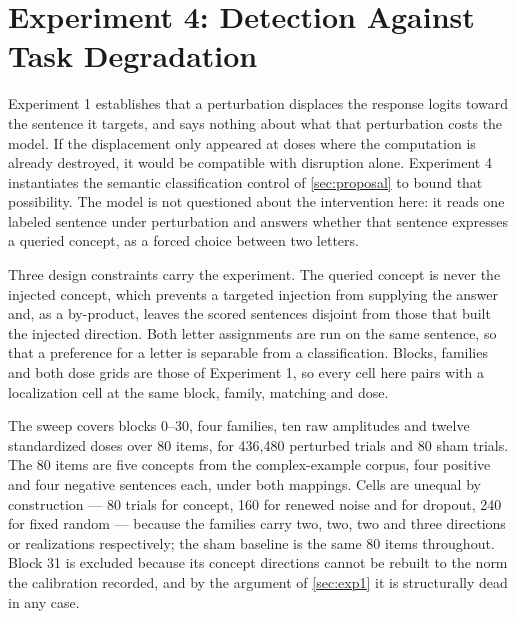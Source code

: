 
\section{Experiment 4: Detection Against Task Degradation}
\label{sec:exp4}

Experiment 1 establishes that a perturbation displaces the response logits toward the sentence it targets, and says nothing about what that perturbation costs the model.
If the displacement only appeared at doses where the computation is already destroyed, it would be compatible with disruption alone.
Experiment 4 instantiates the semantic classification control of \cref{sec:proposal} to bound that possibility.
The model is not questioned about the intervention here: it reads one labeled sentence under perturbation and answers whether that sentence expresses a queried concept, as a forced choice between two letters.

Three design constraints carry the experiment.
The queried concept is never the injected concept, which prevents a targeted injection from supplying the answer and, as a by-product, leaves the scored sentences disjoint from those that built the injected direction.
Both letter assignments are run on the same sentence, so that a preference for a letter is separable from a classification.
Blocks, families and both dose grids are those of Experiment 1, so every cell here pairs with a localization cell at the same block, family, matching and dose.

The sweep covers blocks 0--30, four families, ten raw amplitudes and twelve standardized doses over 80 items, for 436,480 perturbed trials and 80 sham trials.
The 80 items are five concepts from the complex-example corpus, four positive and four negative sentences each, under both mappings.
Cells are unequal by construction --- 80 trials for concept, 160 for renewed noise and for dropout, 240 for fixed random --- because the families carry two, two, two and three directions or realizations respectively; the sham baseline is the same 80 items throughout.
Block 31 is excluded because its concept directions cannot be rebuilt to the norm the calibration recorded, and by the argument of \cref{sec:exp1} it is structurally dead in any case.

